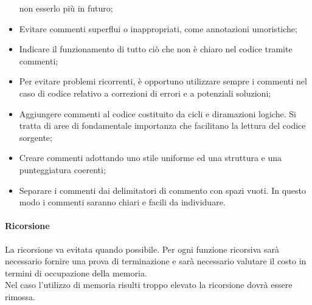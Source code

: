 \documentclass[../NormeDiProgetto_v4.0.0.tex]{subfiles}
\begin{document}
\begin{itemize}
                        non esserlo più in futuro;
                        \item Evitare commenti superflui o inappropriati, come annotazioni umoristiche;
                        \item Indicare il funzionamento di tutto ciò che non è chiaro nel codice tramite commenti;
                        \item Per evitare problemi ricorrenti, è opportuno utilizzare sempre i commenti nel caso di codice
                        relativo a correzioni di errori e a potenziali soluzioni;
                        \item Aggiungere commenti al codice costituito da cicli e diramazioni logiche. Si tratta di aree
                        di fondamentale importanza che facilitano la lettura del codice sorgente;
                        \item Creare commenti adottando uno stile uniforme ed una struttura e una punteggiatura coerenti;
                        \item Separare i commenti dai delimitatori di commento con spazi vuoti. In questo modo i
                        commenti saranno chiari e facili da individuare.
                  \end{itemize}

            \paragraph{Ricorsione}
            La ricorsione va evitata quando possibile. Per ogni funzione ricorsiva sarà necessario fornire una prova di terminazione e sarà necessario valutare il costo in termini di occupazione della memoria. \\
            Nel caso l'utilizzo di memoria risulti troppo elevato la ricorsione dovrà essere rimossa.
			
\end{document}
